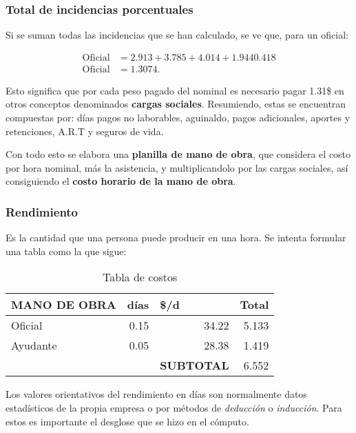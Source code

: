 \documentclass[../main.tex]{subfiles}
\begin{document}
\subsubsection{Total de incidencias porcentuales}

Si se suman todas las incidencias que se han calculado, se ve que, para un oficial:

\begin{align*}
  \text{Oficial} &= 2.913 + 3.785 + 4.014 + 1.944 0.418 \\[5pt] 
  \text{Oficial} &= 1.3074
.\end{align*}

Esto significa que por cada peso pagado del nominal es necesario pagar 1.31\$ en
otros conceptos denominados \textbf{cargas sociales}. Resumiendo, estas se encuentran
compuestas por: días pagos no laborables, aguinaldo, pagos adicionales, aportes 
y retenciones, A.R.T y seguros de vida.

Con todo esto se elabora una \textbf{planilla de mano de obra}, que considera
el costo por hora nominal, más la asistencia, y multiplicandolo por las cargas 
sociales, así consiguiendo el \textbf{costo horario de la mano de obra}.

\subsubsection{Rendimiento}

Es la cantidad que una persona puede producir en una hora. Se intenta formular
una tabla como la que sigue:

\begin{table}[ht]
  \centering
  \caption{Tabla de costos}
    \begin{tabular}{rr|l|r|}
    \hline
    \multicolumn{1}{|l|}{\textbf{MANO DE OBRA}} & \multicolumn{1}{l|}{días} & \$/d   & \multicolumn{1}{l|}{Total} \bigstrut\\
    \hline
    \multicolumn{1}{|l|}{Oficial} & 0.15  & \multicolumn{1}{r|}{34.22} & 5.133 \bigstrut\\
    \hline
    \multicolumn{1}{|l|}{Ayudante} & 0.05  & \multicolumn{1}{r|}{28.38} & 1.419 \bigstrut\\
    \hline
          &       & \textbf{SUBTOTAL} & 6.552 \bigstrut\\
\cline{3-4}    \end{tabular}%
  \label{tab:addlabel}%
\end{table}%

Los valores orientativos del rendimiento en días son normalmente datos estadísticos
de la propia empresa o por métodos de \textit{deducción} o \textit{inducción}.
Para estos es importante el desglose que se hizo en el cómputo.
\end{document}
